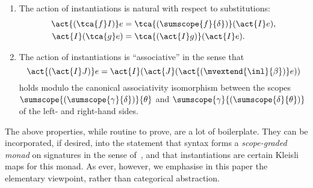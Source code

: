 \begin{propositionwithqed}
\begin{enumerate}
  \item
    The action of instantiations is natural with respect to substitutions:
    \begin{align*}
      \act{(\tca{f} I)} e & = \tca{(\sumscope{f}{\delta})} (\act{I} e), \\
      \act{I} (\tca{g} e) &= \tca{(\act{I} g)} (\act{I} e).
    \end{align*}

  \item
    The action of instantiations is “associative” in the sense that
    \begin{equation*}
      \act{(\act{I} J)} e = \act{I}(\act{J} (\act{(\mvextend{\inl}{\beta})} e))
    \end{equation*}
    holds modulo the canonical associativity isomorphism between the scopes $\sumscope{(\sumscope{\gamma}{\delta})}{\theta}$ and $\sumscope{\gamma}{(\sumscope{\delta}{\theta})}$ of the left- and right-hand sides. \qedhere
  \end{enumerate}
\end{propositionwithqed}

The above properties, while routine to prove, are a lot of boilerplate.
%
They can be incorporated, if desired, into the statement that syntax forms a \emph{scope-graded monad} on signatures in the sense of~\citep{orchard-wadler-eades}, and that instantiations are certain Kleisli maps for this monad.
%
As ever, however, we emphasise in this paper the elementary viewpoint, rather than categorical abstraction.

